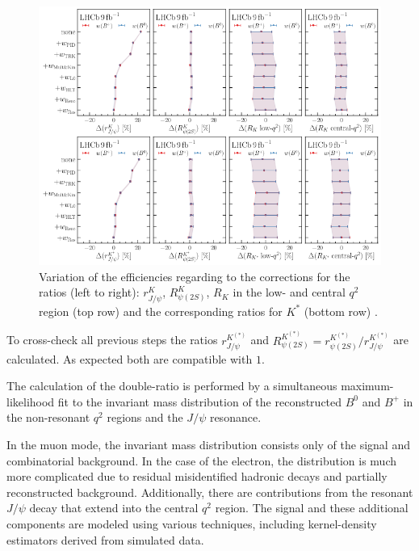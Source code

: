 \begin{figure}
    \centering
    \includegraphics[width=\linewidth]{figures/weights.png}
    \caption{Variation of the efficiencies regarding to the corrections for the ratios (left to right):
    $r^{K}_{J\!/\!\psi}$, $R^{K}_{\psi(2S)}$, $R_{K}$ in the low- and central $q^2$ region (top row) 
    and the corresponding ratios for $K^*$ (bottom row) %
    \cite{lhcbcollaboration2022test}.}
    \label{fig:weights}
\end{figure}
To cross-check all previous steps the ratios $r^{K^{(*)}}_{J\!/\!\psi}$ and 
${R^{K^{(*)}}_{\psi(2S)}=r^{K^{(*)}}_{\psi(2S)}/r^{K^{(*)}}_{J\!/\!\psi}}$ 
are calculated. As expected both are compatible with $\num{1}$.

The calculation of the double-ratio is performed by a simultaneous maximum-likelihood 
fit to the invariant mass distribution of the reconstructed $B^0$ and $B^+$ in the 
non-resonant $q^2$ regions and the $J\!/\!\psi$ resonance. 

In the muon mode, the invariant mass distribution consists only of the signal and 
combinatorial background. 
In the case of the electron, the distribution is much more complicated due to 
residual misidentified hadronic decays and partially reconstructed background. 
Additionally, there are contributions from the resonant $J\!/\!\psi$ decay that extend 
into the central $q^2$ region. 
The signal and these additional components are modeled using various techniques, 
including kernel-density estimators derived from simulated data.

